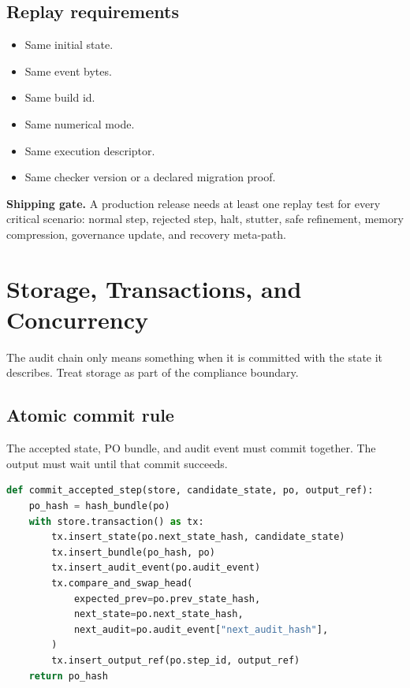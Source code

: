 \documentclass[11pt,oneside]{article}
\newenvironment{shipbox}{\begin{shaded}\noindent\textbf{Shipping gate.} }{\end{shaded}}
\begin{document}
\subsection{Replay requirements}
\begin{itemize}
\item Same initial state.
\item Same event bytes.
\item Same build id.
\item Same numerical mode.
\item Same execution descriptor.
\item Same checker version or a declared migration proof.
\end{itemize}

\begin{shipbox}
A production release needs at least one replay test for every critical scenario: normal step, rejected step, halt, stutter, safe refinement, memory compression, governance update, and recovery meta-path.
\end{shipbox}



\section{Storage, Transactions, and Concurrency}
The audit chain only means something when it is committed with the state it describes. Treat storage as part of the compliance boundary.

\subsection{Atomic commit rule}
The accepted state, PO bundle, and audit event must commit together. The output must wait until that commit succeeds.

\begin{lstlisting}[language=Python,caption={Atomic accepted-step commit.}]
def commit_accepted_step(store, candidate_state, po, output_ref):
    po_hash = hash_bundle(po)
    with store.transaction() as tx:
        tx.insert_state(po.next_state_hash, candidate_state)
        tx.insert_bundle(po_hash, po)
        tx.insert_audit_event(po.audit_event)
        tx.compare_and_swap_head(
            expected_prev=po.prev_state_hash,
            next_state=po.next_state_hash,
            next_audit=po.audit_event["next_audit_hash"],
        )
        tx.insert_output_ref(po.step_id, output_ref)
    return po_hash
\end{lstlisting}
\end{document}
